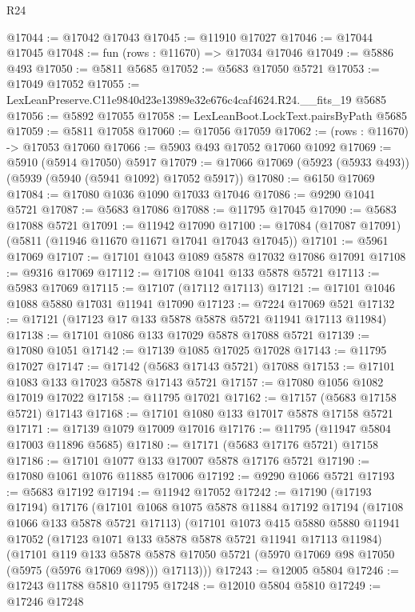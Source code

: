 \begin{lexlean}{R24}
\begin{coremodule}
@17044 := @17042 @17043
@17045 := @11910 @17027
@17046 := @17044 @17045
@17048 := fun (rows : @11670) => @17034 @17046
@17049 := @5886 @493
@17050 := @5811 @5685
@17052 := @5683 @17050 @5721
@17053 := @17049 @17052
@17055 := LexLeanPreserve.C11e9840d23e13989e32e676c4caf4624.R24.__fits_19 @5685
@17056 := @5892 @17055
@17058 := LexLeanBoot.LockText.pairsByPath @5685
@17059 := @5811 @17058
@17060 := @17056 @17059
@17062 := (rows : @11670) -> @17053 @17060
@17066 := @5903 @493 @17052 @17060 @1092
@17069 := @5910 (@5914 @17050) @5917
@17079 := @17066 @17069 (@5923 (@5933 @493)) (@5939 (@5940 (@5941 @1092) @17052 @5917))
@17080 := @6150 @17069
@17084 := @17080 @1036 @1090 @17033 @17046
@17086 := @9290 @1041 @5721
@17087 := @5683 @17086
@17088 := @11795 @17045
@17090 := @5683 @17088 @5721
@17091 := @11942 @17090
@17100 := @17084 (@17087 @17091) (@5811 (@11946 @11670 @11671 @17041 @17043 @17045))
@17101 := @5961 @17069
@17107 := @17101 @1043 @1089 @5878 @17032 @17086 @17091
@17108 := @9316 @17069
@17112 := @17108 @1041 @133 @5878 @5721
@17113 := @5983 @17069
@17115 := @17107 (@17112 @17113)
@17121 := @17101 @1046 @1088 @5880 @17031 @11941 @17090
@17123 := @7224 @17069 @521
@17132 := @17121 (@17123 @17 @133 @5878 @5878 @5721 @11941 @17113 @11984)
@17138 := @17101 @1086 @133 @17029 @5878 @17088 @5721
@17139 := @17080 @1051
@17142 := @17139 @1085 @17025 @17028
@17143 := @11795 @17027
@17147 := @17142 (@5683 @17143 @5721) @17088
@17153 := @17101 @1083 @133 @17023 @5878 @17143 @5721
@17157 := @17080 @1056 @1082 @17019 @17022
@17158 := @11795 @17021
@17162 := @17157 (@5683 @17158 @5721) @17143
@17168 := @17101 @1080 @133 @17017 @5878 @17158 @5721
@17171 := @17139 @1079 @17009 @17016
@17176 := @11795 (@11947 @5804 @17003 @11896 @5685)
@17180 := @17171 (@5683 @17176 @5721) @17158
@17186 := @17101 @1077 @133 @17007 @5878 @17176 @5721
@17190 := @17080 @1061 @1076 @11885 @17006
@17192 := @9290 @1066 @5721
@17193 := @5683 @17192
@17194 := @11942 @17052
@17242 := @17190
    (@17193 @17194)
    @17176
    (@17101
      @1068
      @1075
      @5878
      @11884
      @17192
      @17194
      (@17108 @1066 @133 @5878 @5721 @17113)
      (@17101
        @1073
        @415
        @5880
        @5880
        @11941
        @17052
        (@17123 @1071 @133 @5878 @5878 @5721 @11941 @17113 @11984)
        (@17101
          @119
          @133
          @5878
          @5878
          @17050
          @5721
          (@5970 @17069 @98 @17050 (@5975 (@5976 @17069 @98)))
          @17113)))
@17243 := @12005 @5804
@17246 := @17243 @11788 @5810 @11795
@17248 := @12010 @5804 @5810
@17249 := @17246 @17248

\end{coremodule}
\end{lexlean}
